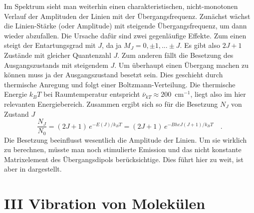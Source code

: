 \begin{marginfigure}
\caption{Verlauf von $2J +1$ und Boltzmann-Faktor mit $J$.}
\end{marginfigure}


Im Spektrum sieht man weiterhin einen charakteristischen, nicht-monotonen Verlauf der Amplituden der Linien mit der Übergangsfrequenz. Zunächst wächst die Linien-Stärke (oder Amplitude) mit steigende Übergangsfrequenz, um dann wieder abzufallen. Die Ursache dafür sind zwei gegenläufige Effekte. Zum einen steigt der Entartungsgrad mit $J$, da ja $M_J = 0, \pm 1, ... \pm J$. Es gibt also $2J+1$ Zustände mit gleicher Quantenzahl $J$.
Zum anderen fällt die Besetzung des Ausgangszustands mit steigendem $J$. Um überhaupt einen Übergang machen zu können muss ja der Ausgangszustand besetzt sein. Dies geschieht durch thermische Anregung und folgt einer Boltzmann-Verteilung. Die thermische Energie $k_B T$ bei Raumtemperatur entspricht  $\bar{\nu}_{k T} \approx 200$~cm$^{-1}$, liegt also im hier relevanten Energiebereich. Zusammen ergibt sich so für die Besetzung $N_J$ von Zustand $J$
\begin{equation}
 \frac{N_J}{N_0}= (2J+1) \, e^{- E(J) / k_B T} = (2J+1) \, e^{- B hc J (J+1) / k_B T}  \quad .
\end{equation}
Die Besetzung beeinflusst wesentlich die Amplitude der Linien. Um sie wirklich zu berechnen, müsste man noch stimulierte Emission und das nicht konstante Matrixelement des Übergangsdipols berücksichtige. Dies führt hier zu weit, ist aber in \cite{Demtröder_molekuelphysik} dargestellt.













\section{III Vibration von Molekülen }


